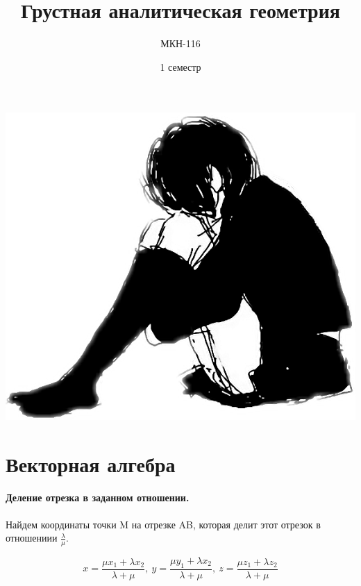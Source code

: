 \documentclass[a4paper]{article}
\title{{\Huge Грустная аналитическая геометрия}}
\author{МКН-116}
\date{1 семестр}
\numberwithin{equation}{section}
\begin{document}
\begin{titlepage}
    \maketitle
    \pagecolor{yellow}\afterpage{\nopagecolor}
    \vfill
    \begin{center}
        \includegraphics[width=\textwidth]{103-1032417_transparent-anime-girl-sad.png}
    \end{center}
    \vfill
    \vfill
\end{titlepage}

\tableofcontents

\newpage

\section{Векторная алгебра}

\paragraph{Деление отрезка в заданном отношении.} 
Найдем координаты точки M на отрезке AB, которая делит этот отрезок в отношениии $\frac{\lambda}{\mu}$.

\begin{equation}
x = \frac{\mu x_1 + \lambda x_2}{\lambda + \mu}, \:
y = \frac{\mu y_1 + \lambda x_2}{\lambda + \mu}, \:
z = \frac{\mu z_1 + \lambda z_2}{\lambda + \mu}
\end{equation}
\end{document}
